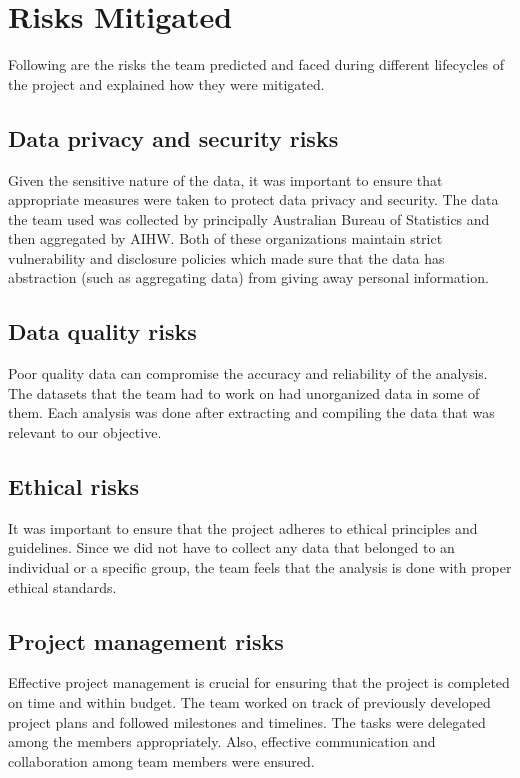 \section{Risks Mitigated}
Following are the risks the team predicted and faced during different lifecycles of the project and explained how they were mitigated.

\subsection{Data privacy and security risks} Given the sensitive nature of the data, it was important to ensure that appropriate measures were taken to protect data privacy and security. The data the team used was collected by principally Australian Bureau of Statistics and then aggregated by AIHW. Both of these organizations maintain strict vulnerability and disclosure policies\cite{vulPol} which made sure that the data has abstraction (such as aggregating data) from giving away personal information.

\subsection{Data quality risks} Poor quality data can compromise the accuracy and reliability of the analysis. The datasets that the team had to work on had unorganized data in some of them. Each analysis was done after extracting and compiling the data that was relevant to our objective.

\subsection{Ethical risks} It was important to ensure that the project adheres to ethical principles and guidelines. Since we did not have to collect any data that belonged to an individual or a specific group, the team feels that the analysis is done with proper ethical standards.

\subsection{Project management risks} Effective project management is crucial for ensuring that the project is completed on time and within budget. The team worked on track of previously developed project plans  and followed milestones and timelines. The tasks were delegated among the members appropriately. Also, effective communication and collaboration among team members were ensured.

